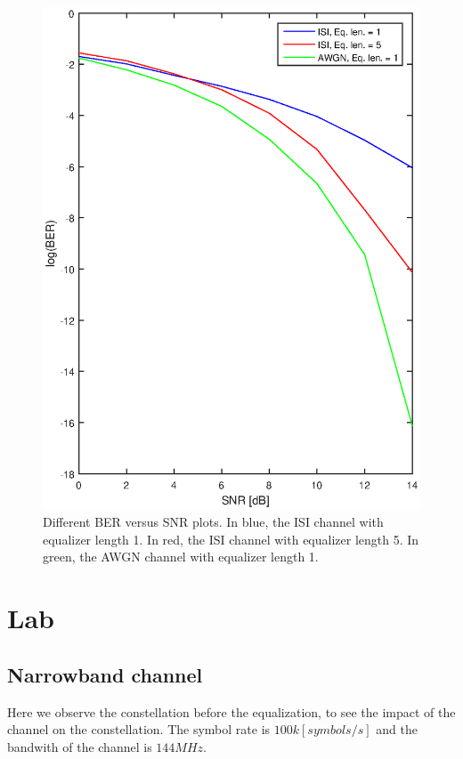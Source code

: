 \documentclass{article}
\begin{document}
    \begin{figure}[h!]
    \centering
    \includegraphics[scale = 0.6]{SNR1}
    \caption{Different BER versus SNR plots. In blue, the ISI channel with equalizer length 1.  In red, the ISI channel with equalizer length 5.  In green, the AWGN channel with equalizer length 1.}
    \label{snr1}
\end{figure}
    
\section{Lab}
\subsection{Narrowband channel}
Here we observe the constellation before the equalization, to see the impact of the channel on the constellation. The symbol rate is $100k [symbols/s]$ and the bandwith of the channel is $144MHz$. %
\end{document}
